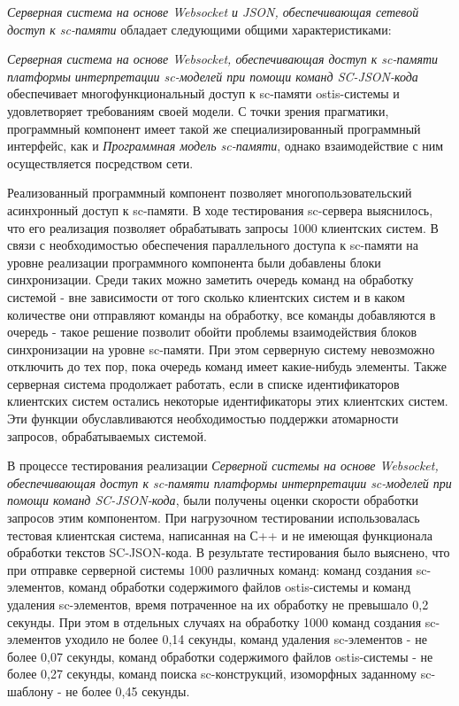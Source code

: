 \textit{Серверная система на основе Websocket и JSON, обеспечивающая сетевой доступ к sc-памяти} обладает следующими
общими характеристиками:
\begin{scnitemize}
	\item \textit{Серверная система на основе Websocket, обеспечивающая доступ к sc-памяти платформы интерпретации
    sc-моделей при помощи команд SC-JSON-кода} обеспечивает многофункциональный доступ к sc-памяти ostis-системы и
    удовлетворяет требованиям своей модели. С точки зрения прагматики, программный компонент имеет такой же
    специализированный программный интерфейс, как и \textit{Программная модель sc-памяти}, однако взаимодействие с
    ним осуществляется посредством сети.
	\item Реализованный программный компонент позволяет многопользовательский асинхронный доступ к sc-памяти. В ходе
    тестирования sc-сервера выяснилось, что его реализация позволяет обрабатывать запросы 1000 клиентских систем.
    В связи с необходимостью обеспечения параллельного доступа к sc-памяти на уровне реализации программного
    компонента были добавлены блоки синхронизации. Среди таких можно заметить очередь команд на обработку системой - вне
    зависимости от того сколько клиентских систем и в каком количестве они отправляют команды на обработку, все команды
    добавляются в очередь - такое решение позволит обойти проблемы взаимодействия блоков синхронизации на уровне sc-памяти.
    При этом серверную систему невозможно отключить до тех пор, пока очередь команд имеет какие-нибудь элементы. Также
    серверная система продолжает работать, если в списке идентификаторов клиентских систем остались некоторые
    идентификаторы этих клиентских систем. Эти функции обуславливаются необходимостью поддержки атомарности запросов,
    обрабатываемых системой.
	\item В процессе тестирования реализации \textit{Серверной системы на основе Websocket, обеспечивающая доступ к
    sc-памяти платформы интерпретации sc-моделей при помощи команд SC-JSON-кода}, были получены оценки скорости
    обработки запросов этим компонентом. При нагрузочном тестировании использовалась тестовая клиентская система,
    написанная на С++ и не имеющая функционала обработки текстов SC-JSON-кода. В результате тестирования было выяснено,
    что при отправке серверной системы 1000 различных команд: команд создания sc-элементов, команд обработки содержимого
    файлов ostis-системы и команд удаления sc-элементов, время потраченное на их обработку не превышало 0,2 секунды.
    При этом в отдельных случаях на обработку 1000 команд создания sc-элементов уходило не более 0,14 секунды, команд
    удаления sc-элементов - не более 0,07 секунды, команд обработки содержимого файлов ostis-системы - не более 0,27 секунды,
    команд поиска sc-конструкций, изоморфных заданному sc-шаблону - не более 0,45 секунды.
\end{scnitemize}

